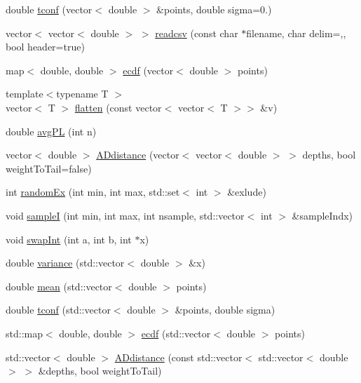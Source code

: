 \begin{DoxyCompactItemize}
double \hyperlink{namespaceutil_a68758b62ab028fd0a2f0afb6d516be6f}{tconf} (vector$<$ double $>$ \&points, double sigma=0.)
\item 
vector$<$ vector$<$ double $>$ $>$ \hyperlink{namespaceutil_a84b10f9fb76cc3f825e8c680ca7d786e}{readcsv} (const char $\ast$filename, char delim=\textquotesingle{},\textquotesingle{}, bool header=true)
\item 
map$<$ double, double $>$ \hyperlink{namespaceutil_ac7478c2543d3bf4901961c719ecc7d04}{ecdf} (vector$<$ double $>$ points)
\item 
{\footnotesize template$<$typename T $>$ }\\vector$<$ T $>$ \hyperlink{namespaceutil_a3da5afd362118ed04ca18ec46d5e6a96}{flatten} (const vector$<$ vector$<$ T $>$$>$ \&v)
\item 
double \hyperlink{namespaceutil_a1f106b9a1a65806393f73a3c8dbf01a6}{avg\+PL} (int n)
\item 
vector$<$ double $>$ \hyperlink{namespaceutil_a422abe670c555eeeded897e3d9861b77}{A\+Ddistance} (vector$<$ vector$<$ double $>$ $>$ depths, bool weight\+To\+Tail=false)
\item 
int \hyperlink{namespaceutil_ae080f004741b0ea81032b3ec0c723f4c}{random\+Ex} (int min, int max, std\+::set$<$ int $>$ \&exlude)
\item 
void \hyperlink{namespaceutil_a077f5faad89062a4013dc98fc85b7a40}{sampleI} (int min, int max, int nsample, std\+::vector$<$ int $>$ \&sample\+Indx)
\item 
void \hyperlink{namespaceutil_a8a222a481a56e4070f023d369483f707}{swap\+Int} (int a, int b, int $\ast$x)
\item 
double \hyperlink{namespaceutil_a2f9d2ca343c1e5fcbc1da5140de61f94}{variance} (std\+::vector$<$ double $>$ \&x)
\item 
double \hyperlink{namespaceutil_a67baa21858f5d569c1553bb179da7115}{mean} (std\+::vector$<$ double $>$ points)
\item 
double \hyperlink{namespaceutil_a0b673442b1c87f0daf8bb0a4179a6834}{tconf} (std\+::vector$<$ double $>$ \&points, double sigma)
\item 
std\+::map$<$ double, double $>$ \hyperlink{namespaceutil_abfb0e38d71ca69f5f6a505b3f5f7dc52}{ecdf} (std\+::vector$<$ double $>$ points)
\item 
std\+::vector$<$ double $>$ \hyperlink{namespaceutil_a08fbdd196c73244d0e2130c3a70d2f2b}{A\+Ddistance} (const std\+::vector$<$ std\+::vector$<$ double $>$ $>$ \&depths, bool weight\+To\+Tail)
\end{DoxyCompactItemize}
